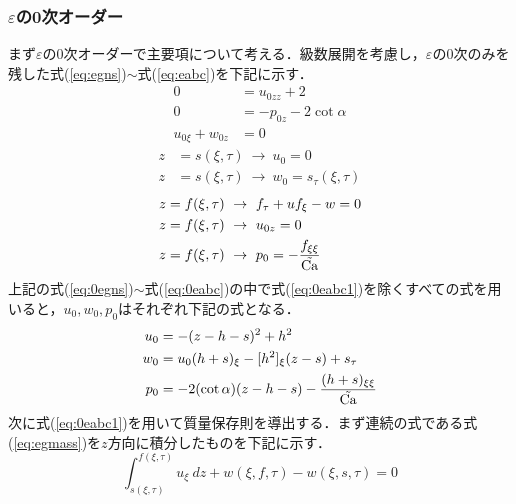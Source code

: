 \documentclass[autodetect-engine,dvipdfmx-if-dvi,ja=standard,a4paper,11pt]{bxjsarticle} %
\begin{document}
\subsubsection{$\varepsilon$の0次オーダー}
まず$\varepsilon$の0次オーダーで主要項について考える．級数展開を考慮し，$\varepsilon$の0次のみを残した式(\ref{eq:egns})$\sim$式(\ref{eq:eabc})を下記に示す．
\begin{subequations}
\begin{align}
0&=u_{0zz}+2\label{eq:0egns1}\\
0&=-p_{0z}-2\cot\alpha\label{eq:0egns2}\\
u_{0\xi}+w_{0z}&=0\label{eq:0egmass}
\end{align}
\label{eq:0egns}
\end{subequations}
\begin{subequations}
\begin{align}
z&=s(\xi,\tau)\ \rightarrow\ u_0=0\label{eq:0esbc1}\\
z&=s(\xi,\tau)\ \rightarrow\ w_0=s_\tau(\xi,\tau)\label{eq:0esbc2}
\end{align}
\label{eq:0esbc}
\end{subequations}
\begin{subequations}
\begin{align}
z&=f(\xi,\tau)\ \rightarrow\ f_\tau+uf_\xi-w=0\label{eq:0eabc1}\\
z&=f(\xi,\tau)\ \rightarrow\ u_{0z}=0\label{eq:0eabc2}\\
z&=f(\xi,\tau)\ \rightarrow\ p_0=-\frac{f_{\xi\xi}}{\tilde{\rm Ca}}\label{eq:0eabc3}
\end{align}
\label{eq:0eabc}
\end{subequations}
上記の式(\ref{eq:0egns})$\sim$式(\ref{eq:0eabc})の中で式(\ref{eq:0eabc1})を除くすべての式を用いると，$u_0,w_0,p_0$はそれぞれ下記の式となる．
\begin{subequations}
\begin{align}
u_0&=-(z-h-s)^2+h^2\label{eq:u0}\\
w_0&=u_0(h+s)_\xi-[h^2]_\xi(z-s)+s_\tau\label{eq:v0}\\
p_0&=-2(\cot\alpha)(z-h-s)-\frac{(h+s)_{\xi\xi}}{\tilde{\rm Ca}}\label{eq:p0}
\end{align}
\label{eq:all0}
\end{subequations}
\　次に式(\ref{eq:0eabc1})を用いて質量保存則を導出する．まず連続の式である式(\ref{eq:egmass})を$z$方向に積分したものを下記に示す．
\begin{equation}
\int^{f(\xi,\tau)}_{s(\xi,\tau)}u_\xi\ dz+w(\xi,f,\tau)-w(\xi,s,\tau)=0\label{eq:zmass}
\end{equation}
\end{document}
